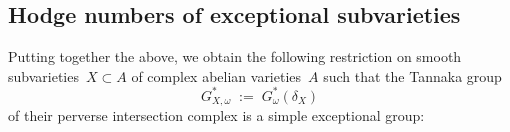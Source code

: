 \documentclass[a4paper]{amsart}
\theoremstyle{plain}
\theoremstyle{definition}
\numberwithin{equation}{section}
\begin{document}

\subsection{Hodge numbers of exceptional subvarieties} 

Putting together the above, we obtain the following restriction on smooth subvarieties~$X\subset A$ of complex abelian varieties~$A$ such that the Tannaka group
%
\[
 G_{X,\omega}^\ast \;:=\; G_\omega^\ast(\delta_X)
\]
%
of their perverse intersection complex is a simple exceptional group:
\end{document}
